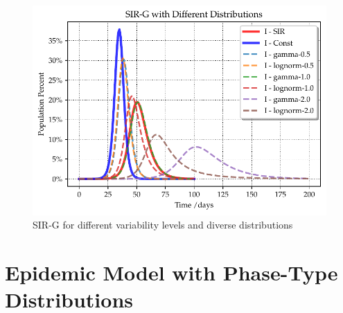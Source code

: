 \documentclass[twoside,USenglish,10pt]{article}
\begin{document}
\begin{figure}
	\centering
	\includegraphics[width=.8\linewidth]{Variance-Analysis.pdf}
	\caption{SIR-G for different variability levels and diverse distributions}
	\label{fig:var}
\end{figure}

\section{Epidemic Model with Phase-Type Distributions}\label{sc:PH}
\end{document}
